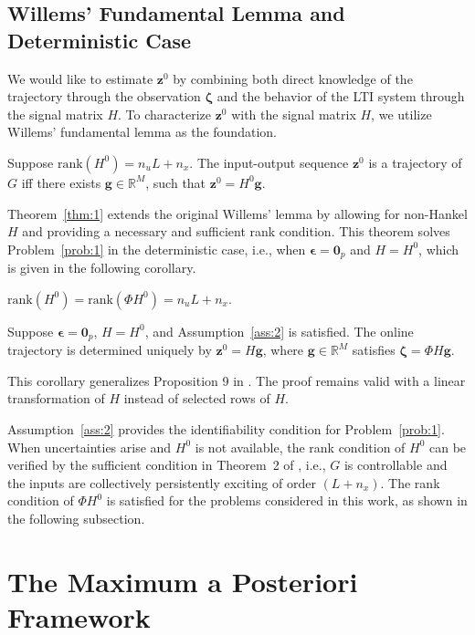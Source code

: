 \documentclass{ifacconf}
\newcommand{\rank}[1]{\mathrm{rank}\left(#1\right)}
\begin{document}
\subsection{Willems' Fundamental Lemma and Deterministic Case}

We would like to estimate $\mathbf{z}^0$ by combining both direct knowledge of the trajectory through the observation $\boldsymbol{\zeta}$ and the behavior of the LTI system through the signal matrix $H$. To characterize $\mathbf{z}^0$ with the signal matrix $H$, we utilize Willems' fundamental lemma as the foundation.
\begin{thm}
\citep[Corollary 19]{IM-FD} Suppose $\rank{H^0}=n_uL+n_x$. The input-output sequence $\mathbf{z}^0$ is a trajectory of $G$ iff there exists $\mathbf{g}\in\mathbb{R}^M$, such that $\mathbf{z}^0=H^0\mathbf{g}$.
\label{thm:1}
\end{thm}
Theorem~\ref{thm:1} extends the original Willems' lemma \citep{Willems_2005} by allowing for non-Hankel $H$ and providing a necessary and sufficient rank condition. This theorem solves Problem~\ref{prob:1} in the deterministic case, i.e., when $\boldsymbol{\epsilon}=\mathbf{0}_p$ and $H=H^0$, which is given in the following corollary.
\begin{assum}
$\rank{H^0}=\rank{\Phi H^0}=n_uL+n_x$.
\label{ass:2}
\end{assum}
\begin{cor}
Suppose $\boldsymbol{\epsilon}=\mathbf{0}_p$, $H=H^0$, and Assumption~\ref{ass:2} is satisfied. The online trajectory is determined uniquely by $\mathbf{z}^0=H\mathbf{g}$, where $\mathbf{g}\in\mathbb{R}^M$ satisfies $\boldsymbol{\zeta} = \Phi H\mathbf{g}$.
\end{cor}
This corollary generalizes Proposition 9 in \cite{MARKOVSKY2022110008}. The proof remains valid with a linear transformation of $H$ instead of selected rows of $H$.

Assumption~\ref{ass:2} provides the identifiability condition for Problem~\ref{prob:1}. When uncertainties arise and $H^0$ is not available, the rank condition of $H^0$ can be verified by the sufficient condition in Theorem~2 of \cite{vanWaarde_2020}, i.e., $G$ is controllable and the inputs are collectively persistently exciting of order $(L+n_x)$. The rank condition of $\Phi H^0$ is satisfied for the problems considered in this work, as shown in the following subsection.

\section{The Maximum a Posteriori Framework}
\label{sec:map}
\end{document}
